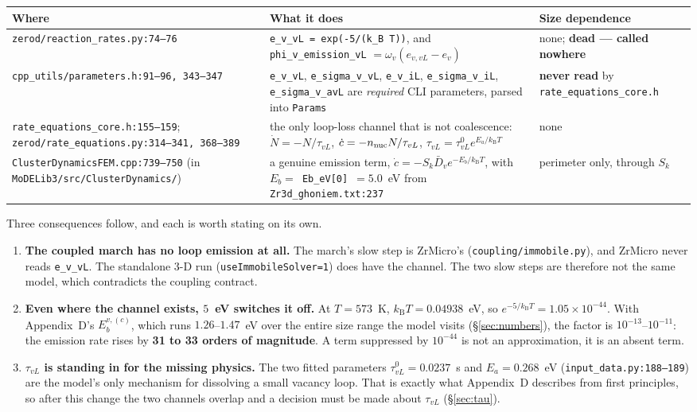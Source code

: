 \documentclass[11pt]{article}
\newcommand{\ZrM}{\textsf{ZrMicro}}
\newcommand{\fbk}{\discretionary{}{}{}}   %
\newcommand{\file}[1]{\texttt{\small #1}}
\newcommand{\kB}{k_{\mathrm B}}
\begin{document}
\begin{center}\small
\begin{tabular}{@{}p{}p{}p{}@{}}
\toprule
\textbf{Where} & \textbf{What it does} & \textbf{Size dependence}\\
\midrule
\file{zerod/\fbk reaction\_\fbk rates.\fbk py:74--76}
  & \verb|e_v_vL = exp(-5/(k_B T))|, and \verb|phi_v_emission_vL|
    $=\omega_v(e_{v,vL}-e_v)$
  & none; \textbf{dead --- called nowhere}\\
\addlinespace
\file{cpp\_\fbk utils/\fbk parameters.\fbk h:91--96, 343--347}
  & \verb|e_v_vL|, \verb|e_sigma_v_vL|, \verb|e_v_iL|, \verb|e_sigma_v_iL|,
    \verb|e_sigma_v_avL| are \emph{required} CLI parameters, parsed into
    \verb|Params|
  & \textbf{never read} by
    \file{rate\_\fbk equations\_\fbk core.\fbk h}\\
\addlinespace
\file{rate\_\fbk equations\_\fbk core.\fbk h:155--159};
\file{zerod/\fbk rate\_\fbk equations.\fbk py:314--341, 368--389}
  & the only loop-loss channel that is not coalescence:
    $\dot N=-N/\tau_{vL}$, $\dot c=-n_{\rm nuc}N/\tau_{vL}$,
    $\tau_{vL}=\tau_{vL}^{0}e^{E_a/\kB T}$
  & none\\
\addlinespace
\file{ClusterDynamicsFEM.\fbk cpp:739--750}
  (in \file{MoDELib3/\fbk src/\fbk ClusterDynamics/})
  & a genuine emission term, $\dot c=-S_k\bar D_v e^{-E_b/\kB T}$, with
    $E_b=$~\verb|Eb_eV[0]|~$=5.0$~eV from
    \file{Zr3d\_\fbk ghoniem.\fbk txt:237}
  & perimeter only, through $S_k$\\
\bottomrule
\end{tabular}
\end{center}

Three consequences follow, and each is worth stating on its own.

\begin{enumerate}
\item \textbf{The coupled march has no loop emission at all.}  The march's
  slow step is \ZrM{}'s (\file{coupling/\fbk immobile.\fbk py}), and \ZrM{}
  never reads \verb|e_v_vL|.  The standalone 3-D run
  (\verb|useImmobileSolver=1|) does have the channel.  The two slow steps are
  therefore not the same model, which contradicts the coupling contract.
\item \textbf{Even where the channel exists, $5$~eV switches it off.}  At
  $T=573$~K, $\kB T=0.04938$~eV, so $e^{-5/\kB T}=1.05\times10^{-44}$.  With
  Appendix~D's $E_b^{v,(c)}$, which runs $1.26$--$1.47$~eV over the entire
  size range the model visits (\S\ref{sec:numbers}), the factor is
  $10^{-13}$--$10^{-11}$: the emission rate rises by \textbf{31 to 33 orders
  of magnitude}.  A term suppressed by $10^{-44}$ is not an approximation, it
  is an absent term.
\item \textbf{$\tau_{vL}$ is standing in for the missing physics.}  The two
  fitted parameters $\tau_{vL}^{0}=0.0237$~s and $E_a=0.268$~eV
  (\file{input\_\fbk data.\fbk py:188--189}) are the model's only mechanism
  for dissolving a small vacancy loop.  That is exactly what Appendix~D
  describes from first principles, so after this change the two channels
  overlap and a decision must be made about $\tau_{vL}$ (\S\ref{sec:tau}).
\end{enumerate}
\end{document}
